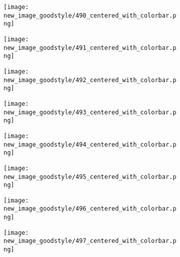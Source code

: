 \documentclass[a4paper,12pt]{article}
\begin{document}
\begin{figure}[H]
  \begin{subfigure}{0.11\textwidth}
    \texttt{[image: new\_image\_goodstyle/490\_centered\_with\_colorbar.png]}
  \end{subfigure}
  \hfill
  \begin{subfigure}{0.11\textwidth}
    \texttt{[image: new\_image\_goodstyle/491\_centered\_with\_colorbar.png]}
  \end{subfigure}
  \hfill
  \begin{subfigure}{0.11\textwidth}
    \texttt{[image: new\_image\_goodstyle/492\_centered\_with\_colorbar.png]}
  \end{subfigure}
  \hfill
  \begin{subfigure}{0.11\textwidth}
    \texttt{[image: new\_image\_goodstyle/493\_centered\_with\_colorbar.png]}
  \end{subfigure}
  \hfill
  \begin{subfigure}{0.11\textwidth}
    \texttt{[image: new\_image\_goodstyle/494\_centered\_with\_colorbar.png]}
  \end{subfigure}
  \hfill
  \begin{subfigure}{0.11\textwidth}
    \texttt{[image: new\_image\_goodstyle/495\_centered\_with\_colorbar.png]}
  \end{subfigure}
  \hfill
  \begin{subfigure}{0.11\textwidth}
    \texttt{[image: new\_image\_goodstyle/496\_centered\_with\_colorbar.png]}
  \end{subfigure}
  \hfill
  \begin{subfigure}{0.11\textwidth}
    \texttt{[image: new\_image\_goodstyle/497\_centered\_with\_colorbar.png]}
  \end{subfigure}
  \hfill
\end{figure}
\end{document}
